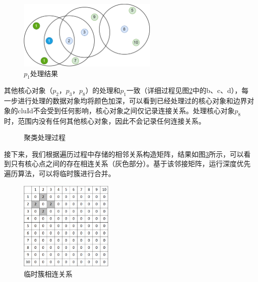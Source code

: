 \begin{figure}[htbp]
	\centering
	\includegraphics[width=0.6\textwidth]{img/db2.png}
	\caption{$ p_1 $处理结果}
	\label{db_one}
\end{figure}

其他核心对象（$ p_2 $，$ p_3 $，$ p_8 $）的处理和$ p_1 $一致（详细过程见图\ref{db_process}中的b、c、d），每一步进行处理的数据对象均将颜色加深，可以看到已经处理过的核心对象和边界对象的cluId不会受到任何影响，核心对象之间仅记录连接关系。处理核心对象$ p_8 $时，范围内没有任何其他核心对象，因此不会记录任何连接关系。

\begin{figure}[htbp]
	\centering
	\caption{聚类处理过程}
	\label{db_process}
\end{figure}

接下来，我们根据遍历过程中存储的相邻关系构造矩阵，结果如图\ref{db_matrix}所示，可以看到只有核心点之间的存在相连关系（灰色部分）。基于该邻接矩阵，运行深度优先遍历算法，可以将临时簇进行合并。

\begin{figure}[htbp]
	\centering
	\includegraphics[width=0.4\textwidth]{img/db_matrix.png}
	\caption{临时簇相连关系}
	\label{db_matrix}
\end{figure}

